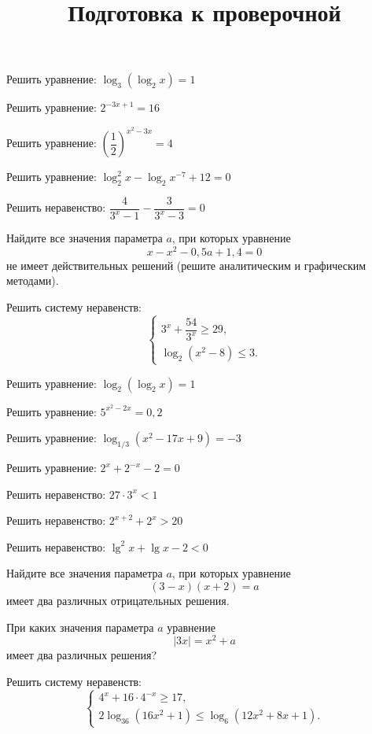 \begin{homework}[number=3]
	\begin{listofex}
		\item Решить уравнение: \( \log_3(\log_2x)=1 \)
		\item Решить уравнение: \( 2^{-3x+1}=16 \)
		\item Решить уравнение: \( \left( \dfrac{1}{2} \right)^{x^2-3x}=4\)
		\item Решить уравнение: \( \log^2_2x-\log_2x^{-7}+12=0 \)
		\item Решить неравенство: \( \dfrac{4}{3^x-1}-\dfrac{3}{3^x-3}=0 \)
		\item Найдите все значения параметра \( a \), при которых уравнение
		\[ x-x^2-0,5a+1,4=0 \]
		не имеет действительных решений (решите аналитическим и графическим методами).
		\item Решить систему неравенств:
		\[ \left\{
		\begin{array}{l}
			3^x+\dfrac{54}{3^x}\ge29,\\
			\log_2(x^2-8)\le3.
		\end{array}
		\right. \]
	\end{listofex}
\end{homework}

\begin{class}[number=7]
	\title{Подготовка к проверочной}
	\begin{listofex}
		\item Решить уравнение: \( \log_2(\log_2x)=1 \)
		\item Решить уравнение: \( 5^{x^2-2x}=0,2 \)
		\item Решить уравнение: \( \log_{1/3}(x^2-17x+9)=-3 \)
		\item Решить уравнение: \( 2^x+2^{-x}-2=0 \)
		\item Решить неравенство: \( 27\cdot3^x<1 \)
		\item Решить неравенство: \( 2^{x+2}+2^x>20 \)
		\item Решить неравенство: \( \lg^2x+\lg x - 2 < 0 \)
		\item Найдите все значения параметра \( a \), при которых уравнение
		\[ (3-x)(x+2)=a \]
		имеет два различных отрицательных решения.
		\item При каких значения параметра \( a \) уравнение
		\[ |3x|=x^2+a \]
		имеет два различных решения?
		\item Решить систему неравенств:
		\[ \left\{
		\begin{array}{l}
			4^x+16\cdot4^{-x}\ge17,\\
			2\log_{36}(16x^2+1)\le\log_6(12x^2+8x+1).
		\end{array}
		\right. \]
	\end{listofex}
\end{class}

